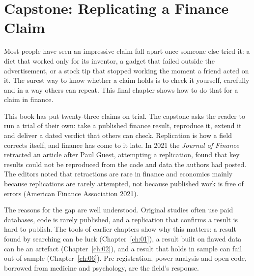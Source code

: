 \makeatletter
{}
\makeatother

\makeatletter
\makeatother

\chapter{Capstone: Replicating a Finance Claim}
\label{ch:23}

Most people have seen an impressive claim fall apart once someone else tried it: a diet that worked only for its inventor, a gadget that failed outside the advertisement, or a stock tip that stopped working the moment a friend acted on it. The surest way to know whether a claim holds is to check it yourself, carefully and in a way others can repeat. This final chapter shows how to do that for a claim in finance.

This book has put twenty-three claims on trial. The capstone asks the reader to run a trial of their own: take a published finance result, reproduce it, extend it and deliver a dated verdict that others can check. Replication is how a field corrects itself, and finance has come to it late. In 2021 the \emph{Journal of Finance} retracted an article after Paul Guest, attempting a replication, found that key results could not be reproduced from the code and data the authors had posted. The editors noted that retractions are rare in finance and economics mainly because replications are rarely attempted, not because published work is free of errors (American Finance Association 2021).

The reasons for the gap are well understood. Original studies often use paid databases, code is rarely published, and a replication that confirms a result is hard to publish. The tools of earlier chapters show why this matters: a result found by searching can be luck (Chapter~\ref{ch:01}), a result built on flawed data can be an artefact (Chapter~\ref{ch:02}), and a result that holds in sample can fail out of sample (Chapter~\ref{ch:06}). Pre-registration, power analysis and open code, borrowed from medicine and psychology, are the field's response.

